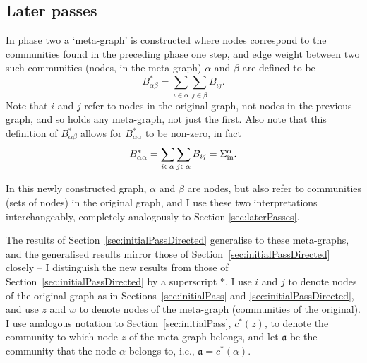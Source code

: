 \documentclass{article}
\begin{document}
\subsection{Later passes}
\label{sec:laterPassesDirected}

In phase two a `meta-graph' is constructed where nodes correspond to 
the communities found in the preceding phase one step, and edge weight
between two such communities (nodes, in the meta-graph)
$\alpha$ and $\beta$ are defined to be
\begin{equation}
	B_{\alpha \beta}^* = \sum_{i \in \alpha}\sum_{j \in \beta}B_{ij}.
	\label{eqn:Bij*}
\end{equation} 
Note that $i$ and $j$ refer to nodes in the original graph, not nodes 
in the previous graph, and so holds any meta-graph, not just the first.
Also note that this definition of $B^*_{\alpha \beta}$ allows for 
$B^*_{\alpha \alpha}$ to be non-zero, in fact
\begin{equation}
B_{\alpha \alpha}^* = \sum_{i \in \alpha}\sum_{j \in \alpha}B_{ij} = \Sigma_{\text{in}}^{\alpha}.
\end{equation} 

In this newly constructed graph, $\alpha$ and $\beta$ are nodes, but 
also refer to communities (sets of nodes) in the original graph, and I 
use these two interpretations interchangeably, completely analogously to 
Section \ref{sec:laterPasses}.

The results of Section~\ref{sec:initialPassDirected} generalise to these meta-graphs,
and the generalised results mirror those of Section~\ref{sec:initialPassDirected} closely
-- I distinguish the new results from those of Section~\ref{sec:initialPassDirected} by a 
superscript $*$.
I use $i$ and $j$ to denote nodes of the original graph as in Sections~\ref{sec:initialPass}
and \ref{sec:initialPassDirected}, 
and use $z$ and $w$ to denote nodes of the meta-graph (communities of the original).
I use analogous notation to Section~\ref{sec:initialPass}, $c^*(z)$, to 
denote the community to which node $z$ of the meta-graph belongs, 
and let $\mathfrak{a}$ be the community that the node $\alpha$ belongs to, 
i.e., $\mathfrak{a} = c^*(\alpha) $.
\end{document}
